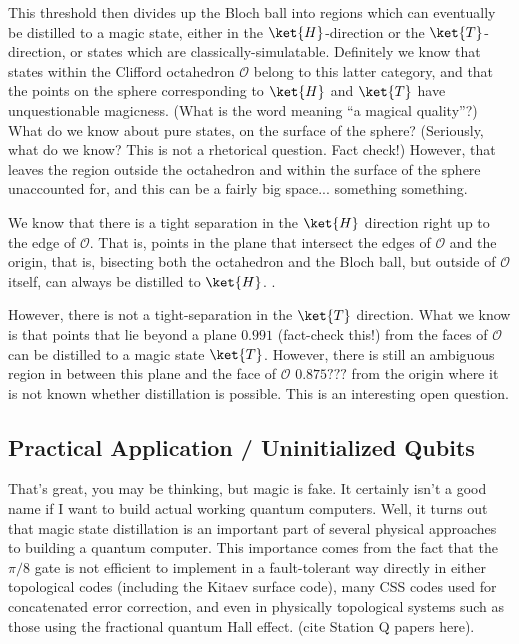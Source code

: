 This threshold then divides up the Bloch ball into regions which can eventually
be distilled to a magic state, either in the $\ket{H}$-direction or the
$\ket{T}$-direction, or states which are classically-simulatable. Definitely
we know that states within the Clifford octahedron $\mathcal{O}$ belong to this
latter category, and that the points on the sphere corresponding to
$\ket{H}$ and $\ket{T}$ have unquestionable magicness. (What is the word meaning
``a magical quality''?) What do we know about pure states, on the surface
of the sphere? (Seriously, what do we know? This is not a rhetorical question.
Fact check!) However, that leaves the region outside the octahedron and within
the surface of the sphere unaccounted for, and this can be a fairly big space...
something something.

We know that there is a tight separation in the $\ket{H}$ direction right up
to the edge of $\mathcal{O}$. That is, points in the plane that intersect
the edges of $\mathcal{O}$ and the origin, that is, bisecting both the
octahedron and the Bloch ball, but outside of $\mathcal{O}$ itself, can always
be distilled to $\ket{H}$. \cite{Bravyi2002}.

However, there is not a tight-separation in the $\ket{T}$ direction. What we
know is that points that lie beyond a plane $0.991$ (fact-check this!) from
the faces of $\mathcal{O}$ can be distilled to a magic state $\ket{T}$.
However, there is still an ambiguous region in between this plane and the
face of $\mathcal{O}$ $0.875???$ from the origin where it is not known
whether distillation is possible. This is an interesting open question.

\subsection{Practical Application / Uninitialized Qubits}

That's great, you may be thinking, but magic is fake. It certainly isn't a good
name if I want to build actual working quantum computers. Well, it turns out
that magic state distillation is an important part of several physical approaches
to building a quantum computer. This importance comes from the fact that the
$\pi/8$ gate is not efficient to implement in a fault-tolerant way directly
in either topological codes (including the Kitaev surface code), many CSS
codes used for concatenated error correction, and even in physically
topological systems such as those using the fractional quantum Hall effect.
(cite Station Q papers here).

